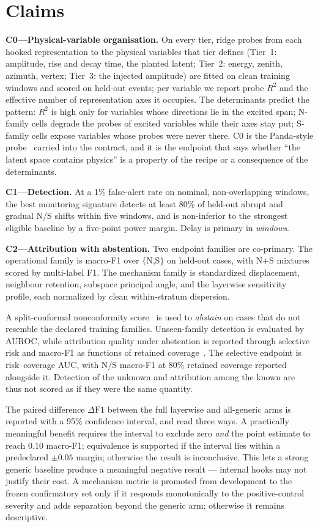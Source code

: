 \documentclass[10pt,twocolumn]{extarticle}
\begin{document}
\section{Claims}
\label{sec:claims}

\textbf{C0---Physical-variable organisation.} On every tier, ridge probes
from each hooked representation to the physical variables that tier defines
(Tier~1: amplitude, rise and decay time, the planted latent; Tier~2: energy,
zenith, azimuth, vertex; Tier~3: the injected amplitude) are fitted on clean
training windows and scored on held-out events; per variable we report probe
$R^2$ and the effective number of representation axes it occupies. The
determinants predict the pattern: $R^2$ is high only for variables whose
directions lie in the excited span; N-family cells degrade the probes of
excited variables while their axes stay put; S-family cells expose variables
whose probes were never there. C0 is the Panda-style probe~\cite{panda2}
carried into the contract, and it is the endpoint that says whether ``the
latent space contains physics'' is a property of the recipe or a consequence
of the determinants.

\textbf{C1---Detection.} At a 1\% false-alert rate on nominal, non-overlapping
windows, the best monitoring signature detects at least 80\% of held-out abrupt
and gradual N/S shifts within five windows, and is non-inferior to the
strongest eligible baseline by a five-point power margin. Delay is primary in
\emph{windows}.

\textbf{C2---Attribution with abstention.} Two endpoint families are
co-primary. The operational family is macro-F1 over $\{$N,S$\}$ on held-out
cases, with N+S mixtures scored by multi-label F1. The mechanism family is
standardized displacement, neighbour retention, subspace principal angle, and
the layerwise sensitivity profile, each normalized by clean within-stratum
dispersion.

A split-conformal nonconformity score~\cite{angelopoulos2021} is used to
\emph{abstain} on cases that do not resemble the declared training families.
Unseen-family detection is evaluated by AUROC, while attribution quality under
abstention is reported through selective risk and macro-F1 as functions of
retained coverage~\cite{geifman2017}. The selective endpoint is risk--coverage
AUC, with N/S macro-F1 at $80\%$ retained coverage reported alongside it.
Detection of the unknown and attribution among the known are thus not scored as
if they were the same quantity.

The paired difference $\Delta\mathrm{F1}$ between the full layerwise and
all-generic arms is reported with a 95\% confidence interval, and read three
ways. A practically meaningful benefit requires the interval to exclude zero
\emph{and} the point estimate to reach $0.10$ macro-F1; equivalence is supported
if the interval lies within a predeclared $\pm0.05$ margin; otherwise the result
is inconclusive. This lets a strong generic baseline produce a meaningful
negative result --- internal hooks may not justify their cost.
A mechanism metric is promoted from development to the frozen confirmatory set
only if it responds monotonically to the positive-control severity and adds
separation beyond the generic arm; otherwise it remains descriptive.
\end{document}
